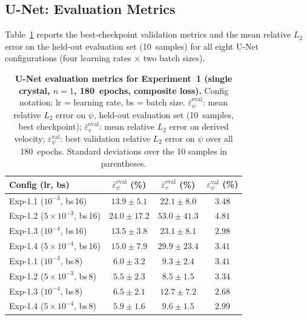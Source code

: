 \FloatBarrier
\subsection{U-Net: Evaluation Metrics}
\label{ssec:results:exp1:unet:metrics}

Table~\ref{tab:unet_metrics_exp1} reports the best-checkpoint validation metrics and the mean relative $L_2$ error on the held-out evaluation set (10~samples) for all eight U-Net configurations (four learning rates $\times$ two batch sizes).

\begin{table}[htbp]
\centering
\caption{\textbf{U-Net evaluation metrics for Experiment~1 (single crystal, $n=1$, 180~epochs, composite loss).} Config notation: lr = learning rate, bs = batch size.
         $\bar{\varepsilon}_\psi^{\mathrm{eval}}$: mean relative $L_2$ error on $\psi$,
         held-out evaluation set (10~samples, best checkpoint);
         $\bar{\varepsilon}_v^{\mathrm{eval}}$: mean relative $L_2$ error on derived velocity;
         $\varepsilon_\psi^{\mathrm{val}}$: best validation relative $L_2$ error on $\psi$
         over all 180~epochs.
         Standard deviations over the 10 samples in parentheses.}
\label{tab:unet_metrics_exp1}
\begin{tabular*}{\textwidth}{@{\extracolsep{\fill}}lccc}
\toprule
\textbf{Config (lr, bs)} & $\bar{\varepsilon}_\psi^{\mathrm{eval}}$ (\%) & $\bar{\varepsilon}_v^{\mathrm{eval}}$ (\%) & $\varepsilon_\psi^{\mathrm{val}}$ (\%) \\
\midrule
Exp-1.1 ($10^{-3}$,        bs\,16) & $13.9 \pm 5.1$  & $22.1 \pm 8.0$  & $3.48$ \\
Exp-1.2 ($5\times10^{-3}$, bs\,16) & $24.0 \pm 17.2$ & $53.0 \pm 41.3$ & $4.81$ \\
Exp-1.3 ($10^{-4}$,        bs\,16) & $13.5 \pm 3.8$  & $23.1 \pm 8.1$  & $2.98$ \\
Exp-1.4 ($5\times10^{-4}$, bs\,16) & $15.0 \pm 7.9$  & $29.9 \pm 23.4$ & $3.41$ \\
\midrule
Exp-1.1 ($10^{-3}$,        bs\,8)  & $6.0 \pm 3.2$   & $9.3 \pm 2.4$   & $3.41$ \\
Exp-1.2 ($5\times10^{-3}$, bs\,8)  & $5.5 \pm 2.3$   & $8.5 \pm 1.5$   & $3.34$ \\
Exp-1.3 ($10^{-4}$,        bs\,8)  & $6.5 \pm 2.1$   & $12.7 \pm 7.2$  & $2.68$ \\
Exp-1.4 ($5\times10^{-4}$, bs\,8)  & $5.9 \pm 1.6$   & $9.6 \pm 1.5$   & $2.99$ \\
\bottomrule
\end{tabular*}
\end{table}

